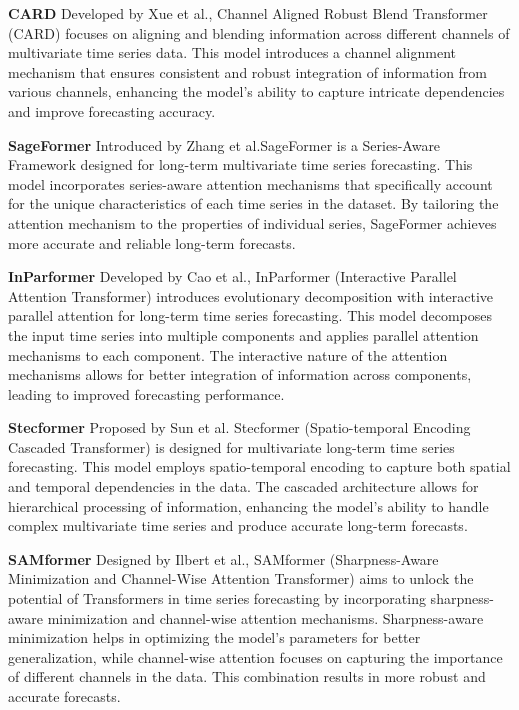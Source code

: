 \noindent\textbf
{CARD}
 Developed by Xue et al.\cite{xue2024cardchannelalignedrobust}, Channel Aligned Robust Blend Transformer (CARD) focuses on aligning and blending information across different channels of multivariate time series data. This model introduces a channel alignment mechanism that ensures consistent and robust integration of information from various channels, enhancing the model’s ability to capture intricate dependencies and improve forecasting accuracy.
\vspace{10pt}


\noindent\textbf
{SageFormer}
 Introduced by Zhang et al.\cite{zhang2023sageformerseriesawareframeworklongterm}SageFormer is a Series-Aware Framework designed for long-term multivariate time series forecasting. This model incorporates series-aware attention mechanisms that specifically account for the unique characteristics of each time series in the dataset. By tailoring the attention mechanism to the properties of individual series, SageFormer achieves more accurate and reliable long-term forecasts.
\vspace{10pt}


\noindent\textbf
{InParformer}
 Developed by Cao et al.\cite{Cao_Huang_Yao_Wang_He_Wang_2023}, InParformer (Interactive Parallel Attention Transformer) introduces evolutionary decomposition with interactive parallel attention for long-term time series forecasting. This model decomposes the input time series into multiple components and applies parallel attention mechanisms to each component. The interactive nature of the attention mechanisms allows for better integration of information across components, leading to improved forecasting performance.
\vspace{10pt}


\noindent\textbf
{Stecformer}
 Proposed by Sun et al.\cite{sun2023stecformerspatiotemporalencodingcascaded} Stecformer (Spatio-temporal Encoding Cascaded Transformer) is designed for multivariate long-term time series forecasting. This model employs spatio-temporal encoding to capture both spatial and temporal dependencies in the data. The cascaded architecture allows for hierarchical processing of information, enhancing the model’s ability to handle complex multivariate time series and produce accurate long-term forecasts.
\vspace{10pt}


\noindent\textbf
{SAMformer}
 Designed by Ilbert et al.\cite{ilbert2024samformerunlockingpotentialtransformers}, SAMformer (Sharpness-Aware Minimization and Channel-Wise Attention Transformer) aims to unlock the potential of Transformers in time series forecasting by incorporating sharpness-aware minimization and channel-wise attention mechanisms. Sharpness-aware minimization helps in optimizing the model’s parameters for better generalization, while channel-wise attention focuses on capturing the importance of different channels in the data. This combination results in more robust and accurate forecasts.

